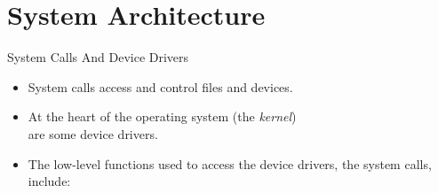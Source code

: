 \documentclass[14pt,aspectratio=1610]{beamer}
\begin{document}


%


\section{System Architecture}


\begin{frame}{System Calls And Device Drivers}
\begin{itemize}
\item System calls access and control files and devices.
\item At the heart of the operating system (the \emph{kernel})\\
  are some device drivers.
\item The low-level functions used to access the device drivers, the system calls, include:
\end{itemize}
\end{frame}
\end{document}
